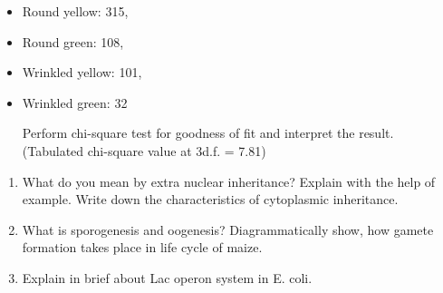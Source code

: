 \documentclass[10pt,]{article}
\providecommand{\tightlist}{%
  \setlength{\itemsep}{0pt}\setlength{\parskip}{0pt}}
\begin{document}
\begin{itemize}
\item
  Round yellow: 315,
\item
  Round green: 108,
\item
  Wrinkled yellow: 101,
\item
  Wrinkled green: 32

  Perform chi-square test for goodness of fit and interpret the result. (Tabulated chi-square value at 3d.f. = 7.81)
\end{itemize}

\begin{enumerate}
\def\labelenumi{\arabic{enumi}.}
\setcounter{enumi}{1}
\tightlist
\item
  What do you mean by extra nuclear inheritance? Explain with the help of example. Write down the characteristics of cytoplasmic inheritance.
\item
  What is sporogenesis and oogenesis? Diagrammatically show, how gamete formation takes place in life cycle of maize.
\item
  Explain in brief about Lac operon system in E. coli.
\end{enumerate}
\end{document}
